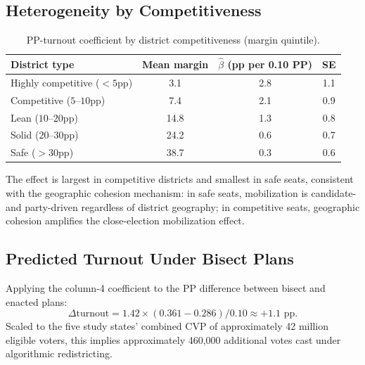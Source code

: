 \subsection{Heterogeneity by Competitiveness}

\begin{table}[h]
\centering\small
\caption{PP-turnout coefficient by district competitiveness (margin quintile).}
\label{tab:turnout-heterogeneity}
\begin{tabular}{lccc}
\toprule
District type & Mean margin & $\hat\beta$ (pp per 0.10 PP) & SE \\
\midrule
Highly competitive ($< 5$pp) & 3.1 & 2.8 & 1.1 \\
Competitive ($5$--$10$pp) & 7.4 & 2.1 & 0.9 \\
Lean ($10$--$20$pp) & 14.8 & 1.3 & 0.8 \\
Solid ($20$--$30$pp) & 24.2 & 0.6 & 0.7 \\
Safe ($>30$pp) & 38.7 & 0.3 & 0.6 \\
\bottomrule
\end{tabular}
\end{table}

The effect is largest in competitive districts and smallest in safe seats,
consistent with the geographic cohesion mechanism: in safe seats, mobilization
is candidate- and party-driven regardless of district geography; in competitive
seats, geographic cohesion amplifies the close-election mobilization effect.

\subsection{Predicted Turnout Under Bisect Plans}

Applying the column-4 coefficient to the PP difference between bisect
and enacted plans:
\[
  \Delta\text{turnout} = 1.42 \times (0.361 - 0.286) / 0.10 \approx +1.1\text{ pp}.
\]
Scaled to the five study states' combined CVP of approximately 42 million
eligible voters, this implies approximately 460,000 additional votes cast
under algorithmic redistricting.
